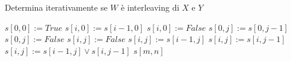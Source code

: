 \documentclass[12pt]{article}
\begin{document}
\begin{algorithm}[H]
    \caption{Determina iterativamente se $W$ è interleaving di $X$ e $Y$}
    \DontPrintSemicolon
     {
        $s[0,0] := True$ \;
         {
             {
                $s[i, 0] := s[i-1, 0]$
            } {
                $s[i, 0] := False$
            }
        }
         {
             {
                $s[0, j] := s[0, j-1]$
            } {
                $s[0, j] := False$
            }
        }
         {
             {
                 {
                    $s[i,j] := False$
                }
                 {
                    $s[i,j] := s[i-1,j]$
                }
                 {
                    $s[i,j] := s[i,j-1]$
                }
                 {
                    $s[i,j] := s[i-1,j] \vee s[i,j-1]$
                }
            }
        }
        \Return $s[m,n]$
    }
\end{algorithm}
\end{document}
